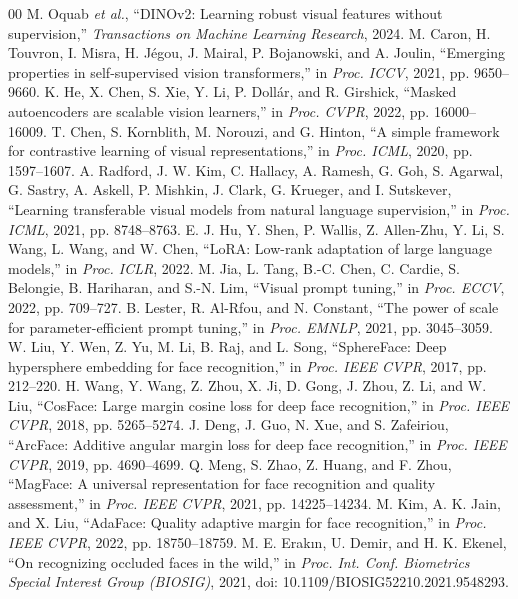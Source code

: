 \documentclass[10pt,journal,compsoc]{IEEEtran}
\begin{document}

\begin{thebibliography}{00}
 M. Oquab \textit{et al.}, ``DINOv2: Learning robust visual features without supervision,'' \textit{Transactions on Machine Learning Research}, 2024.
 M. Caron, H. Touvron, I. Misra, H. J\'egou, J. Mairal, P. Bojanowski, and A. Joulin, ``Emerging properties in self-supervised vision transformers,'' in \textit{Proc. ICCV}, 2021, pp. 9650--9660.
 K. He, X. Chen, S. Xie, Y. Li, P. Doll\'ar, and R. Girshick, ``Masked autoencoders are scalable vision learners,'' in \textit{Proc. CVPR}, 2022, pp. 16000--16009.
 T. Chen, S. Kornblith, M. Norouzi, and G. Hinton, ``A simple framework for contrastive learning of visual representations,'' in \textit{Proc. ICML}, 2020, pp. 1597--1607.
 A. Radford, J. W. Kim, C. Hallacy, A. Ramesh, G. Goh, S. Agarwal, G. Sastry, A. Askell, P. Mishkin, J. Clark, G. Krueger, and I. Sutskever, ``Learning transferable visual models from natural language supervision,'' in \textit{Proc. ICML}, 2021, pp. 8748--8763.
 E. J. Hu, Y. Shen, P. Wallis, Z. Allen-Zhu, Y. Li, S. Wang, L. Wang, and W. Chen, ``LoRA: Low-rank adaptation of large language models,'' in \textit{Proc. ICLR}, 2022.
 M. Jia, L. Tang, B.-C. Chen, C. Cardie, S. Belongie, B. Hariharan, and S.-N. Lim, ``Visual prompt tuning,'' in \textit{Proc. ECCV}, 2022, pp. 709--727.
 B. Lester, R. Al-Rfou, and N. Constant, ``The power of scale for parameter-efficient prompt tuning,'' in \textit{Proc. EMNLP}, 2021, pp. 3045--3059.
 W. Liu, Y. Wen, Z. Yu, M. Li, B. Raj, and L. Song, ``SphereFace: Deep hypersphere embedding for face recognition,'' in \textit{Proc. IEEE CVPR}, 2017, pp. 212--220.
 H. Wang, Y. Wang, Z. Zhou, X. Ji, D. Gong, J. Zhou, Z. Li, and W. Liu, ``CosFace: Large margin cosine loss for deep face recognition,'' in \textit{Proc. IEEE CVPR}, 2018, pp. 5265--5274.
 J. Deng, J. Guo, N. Xue, and S. Zafeiriou, ``ArcFace: Additive angular margin loss for deep face recognition,'' in \textit{Proc. IEEE CVPR}, 2019, pp. 4690--4699.
 Q. Meng, S. Zhao, Z. Huang, and F. Zhou, ``MagFace: A universal representation for face recognition and quality assessment,'' in \textit{Proc. IEEE CVPR}, 2021, pp. 14225--14234.
 M. Kim, A. K. Jain, and X. Liu, ``AdaFace: Quality adaptive margin for face recognition,'' in \textit{Proc. IEEE CVPR}, 2022, pp. 18750--18759.
 M. E. Erakın, U. Demir, and H. K. Ekenel, ``On recognizing occluded faces in the wild,'' in \textit{Proc. Int. Conf. Biometrics Special Interest Group (BIOSIG)}, 2021, doi: 10.1109/BIOSIG52210.2021.9548293.

\end{thebibliography}
\end{document}
